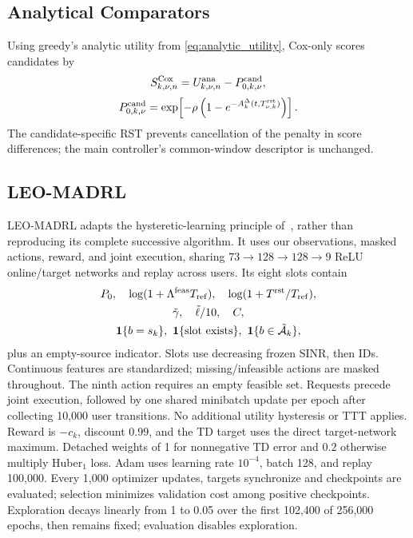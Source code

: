 \documentclass[10pt,letterpaper,journal]{IEEEtran}
\begin{document}
\subsection{Analytical Comparators}
\label{app:cox_only_spec}
Using greedy's analytic utility from \eqref{eq:analytic_utility}, Cox-only scores candidates by
\[
S^{\rm Cox}_{k,\nu,n}=U^{\rm ana}_{k,\nu,n}-P^{\rm cand}_{0,k,\nu},
\]
\[
P^{\rm cand}_{0,k,\nu}=\exp\!\left[-\rho\left(1-e^{-A_k^\Delta(t,T^{\rm rst}_{\nu,k})}\right)\right].
\]
The candidate-specific RST prevents cancellation of the penalty in score differences; the main controller's common-window descriptor is unchanged.

\subsection{LEO-MADRL}
\label{app:adapted_dqn}
LEO-MADRL adapts the hysteretic-learning principle of~\cite{10551688}, rather than reproducing its complete successive algorithm. It uses our observations, masked actions, reward, and joint execution, sharing $73\to128\to128\to9$ ReLU online/target networks and replay across users. Its eight slots contain
\[
\begin{gathered}
P_0,\quad\log(1+\Lambda^{\rm feas}T_{\rm ref}),\quad
\log(1+T^{\rm rst}/T_{\rm ref}),\\
\tilde\gamma,\quad\tilde\ell/10,\quad C,\\
\mathbf1\{b=s_k\},\ \mathbf1\{\text{slot exists}\},\
\mathbf1\{b\in\tilde{\mathcal A}_k\},
\end{gathered}
\]
plus an empty-source indicator. Slots use decreasing frozen SINR, then IDs. Continuous features are standardized; missing/infeasible actions are masked throughout. The ninth action requires an empty feasible set. Requests precede joint execution, followed by one shared minibatch update per epoch after collecting 10,000 user transitions. No additional utility hysteresis or TTT applies. Reward is $-c_k$, discount $0.99$, and the TD target uses the direct target-network maximum. Detached weights of 1 for nonnegative TD error and $0.2$ otherwise multiply Huber$_1$ loss. Adam uses learning rate $10^{-4}$, batch 128, and replay 100,000. Every 1,000 optimizer updates, targets synchronize and checkpoints are evaluated; selection minimizes validation cost among positive checkpoints. Exploration decays linearly from 1 to 0.05 over the first 102,400 of 256,000 epochs, then remains fixed; evaluation disables exploration.
\end{document}
